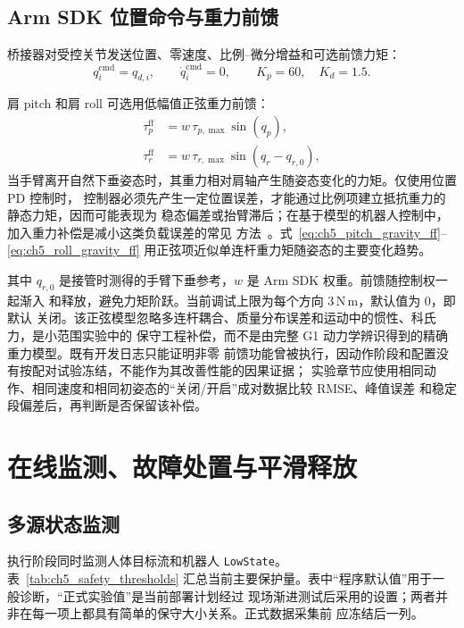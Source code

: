 \subsection{Arm SDK 位置命令与重力前馈}
\label{subsec:ch5_arm_sdk_command}

桥接器对受控关节发送位置、零速度、比例--微分增益和可选前馈力矩：
\begin{equation}
  q_i^{\mathrm{cmd}}=q_{d,i},\qquad
  \dot q_i^{\mathrm{cmd}}=0,
  \qquad K_p=60,\quad K_d=1.5.
  \label{eq:ch5_arm_sdk_pd_command}
\end{equation}

肩 pitch 和肩 roll 可选用低幅值正弦重力前馈：
\begin{align}
  \tau_p^{\mathrm{ff}}
  &=w\,\tau_{p,\max}\sin(q_p),
  \label{eq:ch5_pitch_gravity_ff}\\
  \tau_r^{\mathrm{ff}}
  &=w\,\tau_{r,\max}\sin(q_r-q_{r,0}),
  \label{eq:ch5_roll_gravity_ff}
\end{align}
当手臂离开自然下垂姿态时，其重力相对肩轴产生随姿态变化的力矩。仅使用位置 PD 控制时，
控制器必须先产生一定位置误差，才能通过比例项建立抵抗重力的静态力矩，因而可能表现为
稳态偏差或抬臂滞后；在基于模型的机器人控制中，加入重力补偿是减小这类负载误差的常见
方法~\cite{lynch2017modern}。式~\eqref{eq:ch5_pitch_gravity_ff}--
\eqref{eq:ch5_roll_gravity_ff} 用正弦项近似单连杆重力矩随姿态的主要变化趋势。

其中 $q_{r,0}$ 是接管时测得的手臂下垂参考，$w$ 是 Arm SDK 权重。前馈随控制权一起渐入
和释放，避免力矩阶跃。当前调试上限为每个方向 $3\,\mathrm{N\,m}$，默认值为 0，即默认
关闭。该正弦模型忽略多连杆耦合、质量分布误差和运动中的惯性、科氏力，是小范围实验中的
保守工程补偿，而不是由完整 G1 动力学辨识得到的精确重力模型。既有开发日志只能证明非零
前馈功能曾被执行，因动作阶段和配置没有按配对试验冻结，不能作为其改善性能的因果证据；
实验章节应使用相同动作、相同速度和相同初姿态的“关闭/开启”成对数据比较 RMSE、峰值误差
和稳定段偏差后，再判断是否保留该补偿。

\section{在线监测、故障处置与平滑释放}
\label{sec:ch5_monitoring_release}

\subsection{多源状态监测}
\label{subsec:ch5_online_monitors}

执行阶段同时监测人体目标流和机器人 \texttt{LowState}。表~\ref{tab:ch5_safety_thresholds}
汇总当前主要保护量。表中“程序默认值”用于一般诊断，“正式实验值”是当前部署计划经过
现场渐进测试后采用的设置；两者并非在每一项上都具有简单的保守大小关系。正式数据采集前
应冻结后一列。

